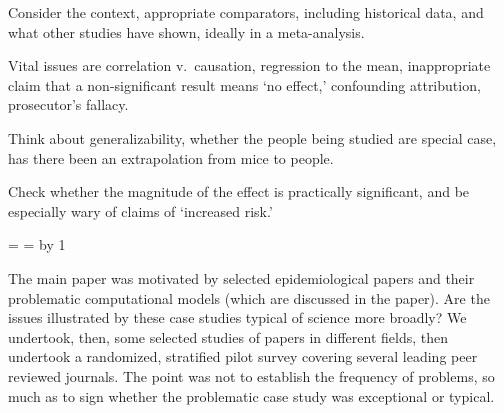 \documentclass[10pt,a4paper]{article}
\begin{document}
\begin{enumerate}
\setcounter{enumi}{\value{resumeCounter}}
 Consider the context, appropriate comparators, including historical data, and what other studies have shown, ideally in a meta-analysis.


 Vital issues are correlation v.\ causation, regression to the mean, inappropriate claim that a non-significant result means `no effect,' confounding attribution, prosecutor's fallacy.


 Think about generalizability, whether the people being studied are special case, has there been an extrapolation from mice to people.


 Check whether the magnitude of the effect is practically significant, and be especially wary of claims of `increased risk.'
\end{enumerate}

\newcount\temporary \temporary=\mainNumberOfReferences
\newcount\temporaryPlusOne \temporaryPlusOne=\temporary
\advance \temporaryPlusOne by 1
\def\MaxMainPaperCitationNumber{\the\temporary}


The main paper was motivated by selected epidemiological papers and their problematic computational models (which are discussed in the paper). Are the issues illustrated by these case studies typical of science more broadly? We undertook, then, some selected studies of papers in different fields, then undertook a randomized, stratified pilot survey covering several leading peer reviewed journals. The point was not to establish the frequency of problems, so much as to sign whether the problematic case study was exceptional or typical. 
\end{document}
